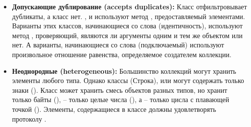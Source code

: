 \documentclass[a4paper,10pt,twoside]{book}
\begin{document}
\begin{itemize}
  \item {\bf Допускающие дублирование (accepts duplicates):}
	Класс  отфильтровывает дубликаты, а класс  нет.
	,  и  используют метод \ct{=}, предоставляемый элементами. Варианты этих классов, начинающиеся со слова  (идентичность), используют метод \ct{==}, проверяющий, являются ли аргументы одним и тем же объектом или нет. А варианты, начинающиеся со слова  (подключаемый) используют произвольное отношение равенства, определяемое создателем коллекции.

  \item {\bf Неоднородные (heterogeneous):}
	Большинство коллекций могут хранить элементы любого типа.
	Однако классы  (Строка),  или  могут содержать только знаки ().
	Класс  может хранить смесь объектов разных типов, но  хранит только байты (),  -- только целые числа (), а  -- только цисла с плавающей точкой ().
	Элементы, содержащиеся в классе  должны удовлетворять протоколу .

\end{itemize}


\end{document}
